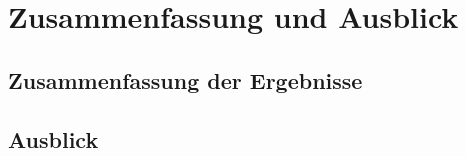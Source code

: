 \chapter{Zusammenfassung und Ausblick}
\label{ch:conclusions}


\section{Zusammenfassung der Ergebnisse}
\label{sec:conclusions}


\section{Ausblick}
\label{sec:futurework}

